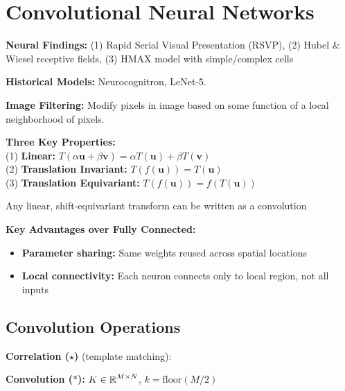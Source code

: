 \section{Convolutional Neural Networks}

\textbf{Neural Findings:} (1) Rapid Serial Visual Presentation (RSVP), (2) Hubel \& Wiesel receptive fields, (3) HMAX model with simple/complex cells

\textbf{Historical Models:} Neurocognitron, LeNet-5.

\textbf{Image Filtering:} Modify pixels in image based on some function of a local neighborhood of pixels.

\textbf{Three Key Properties:}\\
(1) \textbf{Linear:} $T(\alpha \mathbf{u} + \beta \mathbf{v}) = \alpha T(\mathbf{u}) + \beta T(\mathbf{v})$\\
(2) \textbf{Translation Invariant:} $T(f(\mathbf{u})) = T(\mathbf{u})$ \\
(3) \textbf{Translation Equivariant:} $T(f(\mathbf{u})) = f(T(\mathbf{u}))$

\begin{highlightbox*}[gray!30]
Any linear, shift-equivariant transform can be written as a convolution
\end{highlightbox*}

\textbf{Key Advantages over Fully Connected:}
\begin{itemize}
    \item \textbf{Parameter sharing:} Same weights reused across spatial locations
    \item \textbf{Local connectivity:} Each neuron connects only to local region, not all inputs
\end{itemize}

\subsection{Convolution Operations}

\textbf{Correlation ($\star$)} (template matching):

\textbf{Convolution ($*$):} $K \in \operatorname{\mathbb{R}}^{M \times N}$, $k=\text{floor}(M/2)$
{\small
{}
}



